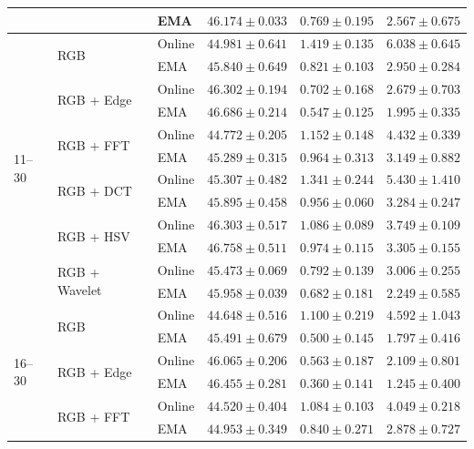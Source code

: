 \begin{table}[htbp]
\begin{tabular}{lllccc}
 &  & EMA & $46.174 \pm 0.033$ & $0.769 \pm 0.195$ & $2.567 \pm 0.675$ \\
\midrule
\multirow{12}{*}{11--30} & \multirow{2}{*}{RGB} & Online & $44.981 \pm 0.641$ & $1.419 \pm 0.135$ & $6.038 \pm 0.645$ \\
 &  & EMA & $45.840 \pm 0.649$ & $0.821 \pm 0.103$ & $2.950 \pm 0.284$ \\
\addlinespace[2pt]
 & \multirow{2}{*}{RGB + Edge} & Online & $46.302 \pm 0.194$ & $0.702 \pm 0.168$ & $2.679 \pm 0.703$ \\
 &  & EMA & $46.686 \pm 0.214$ & $\mathbf{0.547 \pm 0.125}$ & $\mathbf{1.995 \pm 0.335}$ \\
\addlinespace[2pt]
 & \multirow{2}{*}{RGB + FFT} & Online & $44.772 \pm 0.205$ & $1.152 \pm 0.148$ & $4.432 \pm 0.339$ \\
 &  & EMA & $45.289 \pm 0.315$ & $0.964 \pm 0.313$ & $3.149 \pm 0.882$ \\
\addlinespace[2pt]
 & \multirow{2}{*}{RGB + DCT} & Online & $45.307 \pm 0.482$ & $1.341 \pm 0.244$ & $5.430 \pm 1.410$ \\
 &  & EMA & $45.895 \pm 0.458$ & $0.956 \pm 0.060$ & $3.284 \pm 0.247$ \\
\addlinespace[2pt]
 & \multirow{2}{*}{RGB + HSV} & Online & $46.303 \pm 0.517$ & $1.086 \pm 0.089$ & $3.749 \pm 0.109$ \\
 &  & EMA & $\mathbf{46.758 \pm 0.511}$ & $0.974 \pm 0.115$ & $3.305 \pm 0.155$ \\
\addlinespace[2pt]
 & \multirow{2}{*}{RGB + Wavelet} & Online & $45.473 \pm 0.069$ & $0.792 \pm 0.139$ & $3.006 \pm 0.255$ \\
 &  & EMA & $45.958 \pm 0.039$ & $0.682 \pm 0.181$ & $2.249 \pm 0.585$ \\
\midrule
\multirow{12}{*}{16--30} & \multirow{2}{*}{RGB} & Online & $44.648 \pm 0.516$ & $1.100 \pm 0.219$ & $4.592 \pm 1.043$ \\
 &  & EMA & $45.491 \pm 0.679$ & $0.500 \pm 0.145$ & $1.797 \pm 0.416$ \\
\addlinespace[2pt]
 & \multirow{2}{*}{RGB + Edge} & Online & $46.065 \pm 0.206$ & $0.563 \pm 0.187$ & $2.109 \pm 0.801$ \\
 &  & EMA & $\mathbf{46.455 \pm 0.281}$ & $\mathbf{0.360 \pm 0.141}$ & $\mathbf{1.245 \pm 0.400}$ \\
\addlinespace[2pt]
 & \multirow{2}{*}{RGB + FFT} & Online & $44.520 \pm 0.404$ & $1.084 \pm 0.103$ & $4.049 \pm 0.218$ \\
 &  & EMA & $44.953 \pm 0.349$ & $0.840 \pm 0.271$ & $2.878 \pm 0.727$ \\

\end{tabular}
\end{table}

